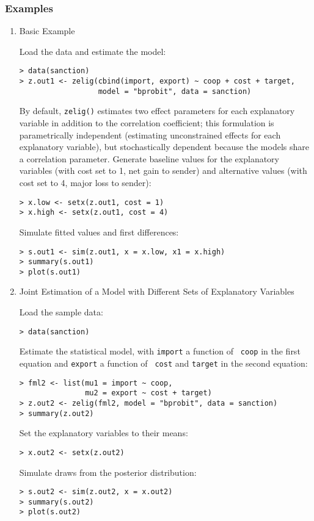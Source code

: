 \subsubsection{Examples}

\begin{enumerate}

\item {Basic Example} \label{basic.bp}

Load the data and estimate the model:  
\begin{verbatim}
> data(sanction)
> z.out1 <- zelig(cbind(import, export) ~ coop + cost + target, 
                  model = "bprobit", data = sanction)
\end{verbatim}
By default, {\tt zelig()} estimates two effect parameters
for each explanatory variable in addition to the correlation coefficient;
this formulation is parametrically independent (estimating
unconstrained effects for each explanatory variable), but
stochastically dependent because the models share a correlation parameter.
\newline \newline Generate baseline values for the explanatory
variables (with cost set to 1, net gain to sender) and alternative
values (with cost set to 4, major loss to sender):
\begin{verbatim}
> x.low <- setx(z.out1, cost = 1)
> x.high <- setx(z.out1, cost = 4)
\end{verbatim}
Simulate fitted values and first differences:  
\begin{verbatim}
> s.out1 <- sim(z.out1, x = x.low, x1 = x.high)
> summary(s.out1)
> plot(s.out1)
\end{verbatim}

\item {Joint Estimation of a Model with Different Sets of Explanatory Variables}\label{sto.dep.probit}

Load the sample data:
\begin{verbatim}
> data(sanction)
\end{verbatim}
Estimate the statistical model, with {\tt import} a function of {\tt
  coop} in the first equation and {\tt export} a function of {\tt
  cost} and {\tt target} in the second equation:
\begin{verbatim}
> fml2 <- list(mu1 = import ~ coop, 
               mu2 = export ~ cost + target)
> z.out2 <- zelig(fml2, model = "bprobit", data = sanction)
> summary(z.out2)
\end{verbatim}
Set the explanatory variables to their means:
\begin{verbatim}
> x.out2 <- setx(z.out2)
\end{verbatim}
Simulate draws from the posterior distribution:
\begin{verbatim}
> s.out2 <- sim(z.out2, x = x.out2)
> summary(s.out2)
> plot(s.out2)
\end{verbatim}


\end{enumerate}
